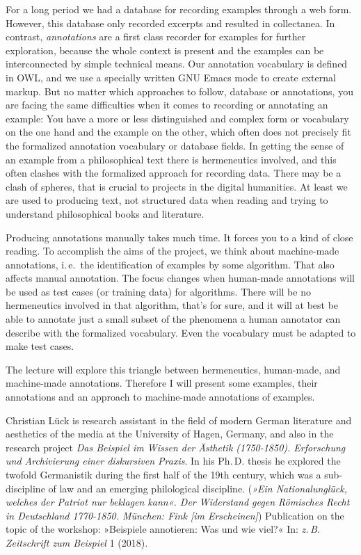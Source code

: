 \documentclass[12pt]{scrartcl}
\begin{document}
For a long period we had a database for recording examples through a
web form.  However, this database only recorded excerpts and resulted
in collectanea.  In contrast, \emph{annotations} are a first class
recorder for examples for further exploration, because the whole
context is present and the examples can be interconnected by simple
technical means.  Our annotation vocabulary is defined in OWL, and we
use a specially written GNU Emacs mode to create external markup.  But
no matter which approaches to follow, database or annotations, you are
facing the same difficulties when it comes to recording or annotating
an example: You have a more or less distinguished and complex form or
vocabulary on the one hand and the example on the other, which often
does not precisely fit the formalized annotation vocabulary or
database fields.  In getting the sense of an example from a
philosophical text there is hermeneutics involved, and this often
clashes with the formalized approach for recording data.  There may be
a clash of spheres, that is crucial to projects in the digital
humanities.  At least we are used to producing text, not structured
data when reading and trying to understand philosophical books and
literature.

Producing annotations manually takes much time.  It forces you to a
kind of close reading.  To accomplish the aims of the project, we
think about machine-made annotations, i.\,e.\ the identification of
examples by some algorithm.  That also affects manual annotation.  The
focus changes when human-made annotations will be used as test cases
(or training data) for algorithms.  There will be no hermeneutics
involved in that algorithm, that's for sure, and it will at best be
able to annotate just a small subset of the phenomena a human
annotator can describe with the formalized vocabulary.  Even the
vocabulary must be adapted to make test cases.

The lecture will explore this triangle between hermeneutics,
human-made, and machine-made annotations. Therefore I will present
some examples, their annotations and an approach to machine-made
annotations of examples.


\newpage
\noindent
Christian Lück is research assistant in the field of modern German
literature and aesthetics of the media at the University of Hagen,
Germany, and also in the research project \emph{Das Beispiel im Wissen
  der Ästhetik (1750-1850). Erforschung und Archivierung einer
  diskursiven Praxis}. In his Ph.\,D. thesis he explored the twofold
Germanistik during the first half of the 19th century, which was a
sub-discipline of law and an emerging philological
discipline. (\emph{»Ein Nationalunglück, welches der Patriot nur
  beklagen kann«. Der Widerstand gegen Römisches Recht in Deutschland
  1770-1850. München: Fink [im Erscheinen]}) Publication on the topic
of the workshop: »Beispiele annotieren: Was und wie viel?« In:
\emph{z.\,B. Zeitschrift zum Beispiel} 1 (2018).
\end{document}
